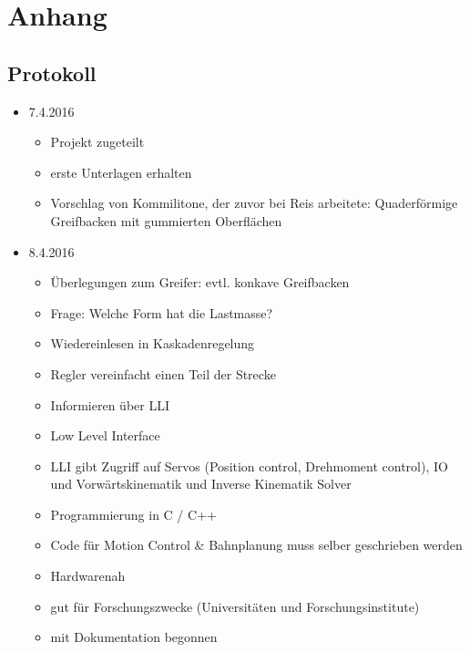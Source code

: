 \documentclass[a4paper,12pt]{article}
\begin{document}
\section*{Anhang}
\subsection{Protokoll}
\begin{itemize}
	\item 7.4.2016
		\begin{itemize}
			\item Projekt zugeteilt
			\item erste Unterlagen erhalten
			\item Vorschlag von Kommilitone, der zuvor bei Reis arbeitete: Quaderförmige Greifbacken mit gummierten Oberflächen
		\end{itemize}
	\item 8.4.2016
		\begin{itemize}
			\item Überlegungen zum Greifer: evtl. konkave Greifbacken
			\item Frage: Welche Form hat die Lastmasse?
			\item Wiedereinlesen in Kaskadenregelung
			\item Regler vereinfacht einen Teil der Strecke		
			\item Informieren über LLI
			\item Low Level Interface
			\item LLI gibt Zugriff auf Servos (Position control, Drehmoment control), IO und Vorwärtskinematik und Inverse Kinematik Solver
			\item Programmierung in C / C++
			\item Code für Motion Control \& Bahnplanung muss selber geschrieben werden
			\item Hardwarenah
			\item gut für Forschungszwecke (Universitäten und Forschungsinstitute)
			\item mit Dokumentation begonnen
		\end{itemize}
\end{itemize}
\end{document}
